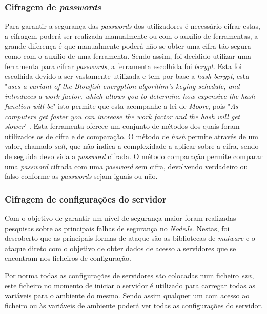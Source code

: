 \subsubsection{Cifragem de \textit{passwords}}
Para garantir a segurança das \textit{passwords} dos utilizadores é necessário cifrar estas, a cifragem poderá ser realizada manualmente ou com o auxílio de ferramentas, a grande diferença é que manualmente poderá não se obter uma cifra tão segura como com o auxílio de uma ferramenta. Sendo assim, foi decidido utilizar uma ferramenta para cifrar \textit{passwords}, a ferramenta escolhida foi \textit{bcrypt}. Esta foi escolhida devido a ser vastamente utilizada e tem por base a \emph{hash} \textit{bcrypt}, esta "\emph{uses a variant of the Blowfish encryption algorithm’s keying schedule, and introduces a work factor, which allows you to determine how expensive the hash function will be}"\citep{bcrypt} isto permite que esta acompanhe a lei de \emph{Moore}, pois "\emph{As computers get faster you can increase the work factor and the hash will get slower}"\citep{bcrypt} . Esta ferramenta oferece um conjunto de métodos dos quais foram utilizados os de cifra e de comparação. O método de \emph{hash} permite através de um valor, chamado \textit{salt}, que não indica a complexidade a aplicar sobre a cifra, sendo de seguida devolvida a \textit{\textit{password}} cifrada. O método comparação permite comparar uma \textit{\textit{password}} cifrada com uma \textit{\textit{password}} sem cifra, devolvendo verdadeiro ou falso conforme as \textit{passwords} sejam iguais ou não.

\subsubsection{Cifragem de configurações do servidor}
Com o objetivo de garantir um nível de segurança maior foram realizadas pesquisas sobre as principais falhas de segurança no \textit{NodeJs}. Nestas, foi descoberto que as principais formas de ataque são as bibliotecas de \textit{malware} e o ataque direto com o objetivo de obter dados de acesso a servidores que se encontram nos ficheiros de configuração.

Por norma todas as configurações de servidores são colocadas num ficheiro \textit{env}, este ficheiro no momento de iniciar o servidor é utilizado para carregar todas as variáveis para o ambiente do mesmo. Sendo assim qualquer um com acesso ao ficheiro ou às variáveis de ambiente poderá ver todas as configurações do servidor.

